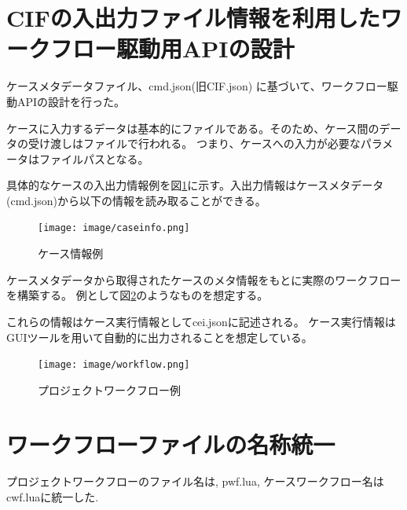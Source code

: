 \documentclass[a4paper,10pt,oneside]{jsbook}
\begin{document}
\section{CIFの入出力ファイル情報を利用したワークフロー駆動用APIの設計}
ケースメタデータファイル、cmd.json(旧CIF.json) に基づいて、ワークフロー駆動APIの設計を行った。

ケースに入力するデータは基本的にファイルである。そのため、ケース間のデータの受け渡しはファイルで行われる。
つまり、ケースへの入力が必要なパラメータはファイルパスとなる。

具体的なケースの入出力情報例を図\ref{fig:caseinfo}に示す。入出力情報はケースメタデータ(cmd.json)から以下の情報を読み取ることができる。

\begin{figure}[htbp]
	\begin{center}
		\texttt{[image: image/caseinfo.png]}
	\end{center}
	\caption{ケース情報例}
	\label{fig:caseinfo}
\end{figure}

ケースメタデータから取得されたケースのメタ情報をもとに実際のワークフローを構築する。
例として図\ref{fig:exampleprojectflow}のようなものを想定する。

これらの情報はケース実行情報としてcei.jsonに記述される。
ケース実行情報はGUIツールを用いて自動的に出力されることを想定している。

\begin{figure}[htbp]
	\begin{center}
		\texttt{[image: image/workflow.png]}
	\end{center}
	\caption{プロジェクトワークフロー例}
	\label{fig:exampleprojectflow}
\end{figure}





\section{ワークフローファイルの名称統一}
プロジェクトワークフローのファイル名は, pwf.lua, ケースワークフロー名は cwf.luaに統一した.
\end{document}
